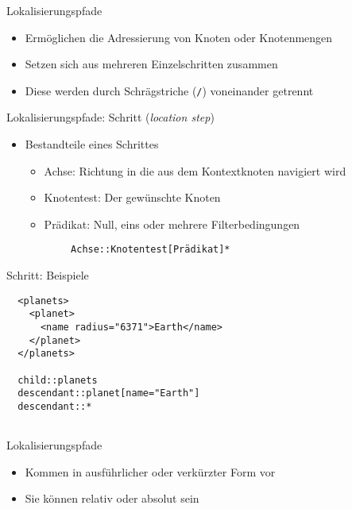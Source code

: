 \documentclass{beamer}
\begin{document}
\begin{frame}{Lokalisierungspfade}
	
	\begin{itemize}
		\item Ermöglichen die Adressierung von Knoten oder Knotenmengen	
		\item Setzen sich aus mehreren Einzelschritten zusammen
		\item Diese werden durch Schrägstriche (\texttt{/}) voneinander getrennt
	\end{itemize}
	
\end{frame}

\begin{frame}[fragile]{Lokalisierungspfade: Schritt (\emph{location step})}
	
	\begin{itemize}
		\item Bestandteile eines Schrittes
		\begin{itemize}
			\item Achse: Richtung in die aus dem Kontextknoten navigiert wird
			\item Knotentest: Der gewünschte Knoten
			\item Prädikat: Null, eins oder mehrere Filterbedingungen
		\end{itemize}
		
		\vspace{1cm}
		\centering
		\begin{verbatim}
        Achse::Knotentest[Prädikat]*
		\end{verbatim}
	\end{itemize}
	
\end{frame}

\begin{frame}[fragile]{Schritt: Beispiele}
	
	\lstset{language=XML}
	\begin{lstlisting}	
  <planets>
    <planet>
      <name radius="6371">Earth</name>
    </planet>
  </planets>
	
  child::planets
  descendant::planet[name="Earth"]
  descendant::*
	
	\end{lstlisting}
	
\end{frame}

\begin{frame}{Lokalisierungspfade}
	
	\begin{itemize}
		\item Kommen in ausführlicher oder verkürzter Form vor 
		\item Sie können relativ oder absolut sein
	\end{itemize}
	
\end{frame}
\end{document}
